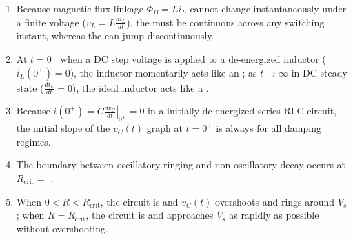 \documentclass[10pt,letterpaper]{article}
\begin{document}
\begin{enumerate}
  \item Because magnetic flux linkage $\Phi_B = L i_L$ cannot change instantaneously under a finite voltage ($v_L = L\frac{di_L}{dt}$), the \underline{\hspace{1.8in}} must be continuous across any switching instant, whereas the \underline{\hspace{1.8in}} can jump discontinuously.
  \item At $t = 0^+$ when a DC step voltage is applied to a de-energized inductor ($i_L(0^+)=0$), the inductor momentarily acts like an \underline{\hspace{1.8in}}; as $t \to \infty$ in DC steady state ($\frac{di_L}{dt} = 0$), the ideal inductor acts like a \underline{\hspace{1.8in}}.
  \item Because $i(0^+) = C\left.\frac{dv_C}{dt}\right|_{0^+} = 0$ in a initially de-energized series RLC circuit, the initial slope of the $v_C(t)$ graph at $t = 0^+$ is always \underline{\hspace{1.8in}} for all damping regimes.
  \item The boundary between oscillatory ringing and non-oscillatory decay occurs at $R_{\text{crit}} =$ \underline{\hspace{1.8in}}.
  \item When $0 < R < R_{\text{crit}}$, the circuit is \underline{\hspace{1.8in}} and $v_C(t)$ overshoots and rings around $V_s$; when $R = R_{\text{crit}}$, the circuit is \underline{\hspace{1.8in}} and approaches $V_s$ as rapidly as possible without overshooting.
\end{enumerate}
\end{document}
